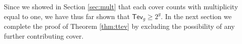 \documentclass[11pt,reqno]{amsart}
\theoremstyle{definition}
\newcommand{\gGamma}{\widehat{\Gamma}}
\newcommand{\Tev}{{\mathsf{Tev}}}
\begin{document}
Since we showed in Section \ref{sec:mult} that each cover counts with multiplicity equal to one, we have thus far shown that $\Tev_g\geq 2^g$. In the next section we complete the proof of Theorem \ref{thm:ttev} by excluding the possibility of any further contributing cover.

\end{document}
